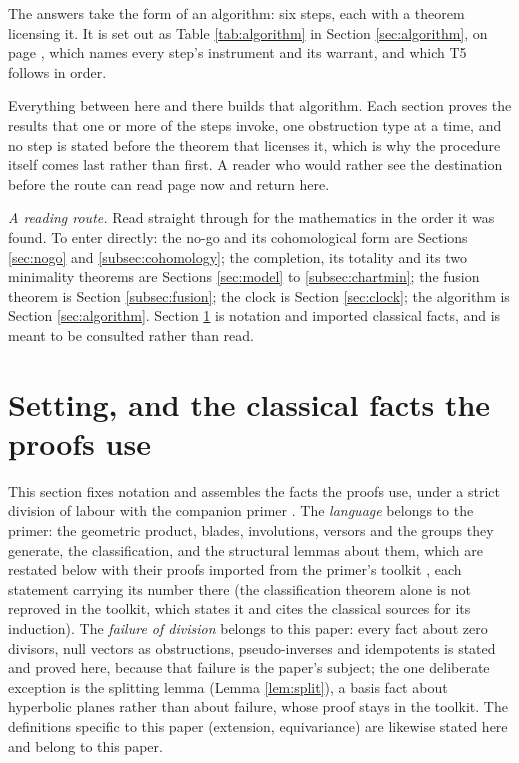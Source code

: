 \noindent The answers take the form of an algorithm: six steps, each with a theorem licensing it. It is set out as Table \ref{tab:algorithm} in Section \ref{sec:algorithm}, on page \pageref{tab:algorithm}, which names every step's instrument and its warrant, and which T5 follows in order.

Everything between here and there builds that algorithm. Each section proves the results that one or more of the steps invoke, one obstruction type at a time, and no step is stated before the theorem that licenses it, which is why the procedure itself comes last rather than first. A reader who would rather see the destination before the route can read page \pageref{tab:algorithm} now and return here.

\emph{A reading route.} Read straight through for the mathematics in the order it was found. To enter directly: the no-go and its cohomological form are Sections \ref{sec:nogo} and \ref{subsec:cohomology}; the completion, its totality and its two minimality theorems are Sections \ref{sec:model} to \ref{subsec:chartmin}; the fusion theorem is Section \ref{subsec:fusion}; the clock is Section \ref{sec:clock}; the algorithm is Section \ref{sec:algorithm}. Section \ref{sec:prelim} is notation and imported classical facts, and is meant to be consulted rather than read.

\section{Setting, and the classical facts the proofs use}\label{sec:prelim}

This section fixes notation and assembles the facts the proofs use, under a strict division of labour with the companion primer \cite{ButlerT0}. The \emph{language} belongs to the primer: the geometric product, blades, involutions, versors and the groups they generate, the classification, and the structural lemmas about them, which are restated below with their proofs imported from the primer's toolkit \cite[Section 9]{ButlerT0}, each statement carrying its number there (the classification theorem alone is not reproved in the toolkit, which states it and cites the classical sources for its induction). The \emph{failure of division} belongs to this paper: every fact about zero divisors, null vectors as obstructions, pseudo-inverses and idempotents is stated and proved here, because that failure is the paper's subject; the one deliberate exception is the splitting lemma (Lemma \ref{lem:split}), a basis fact about hyperbolic planes rather than about failure, whose proof stays in the toolkit. The definitions specific to this paper (extension, equivariance) are likewise stated here and belong to this paper.

